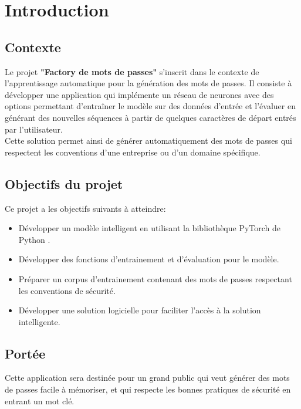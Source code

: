 \section{Introduction}

\subsection{Contexte}
Le projet \textbf{"Factory de mots de passes"} s'inscrit dans le contexte de l'apprentissage automatique pour la génération des mots de passes. Il consiste à développer une application qui implémente un réseau de neurones avec des options permettant d'entraîner le modèle sur des données d'entrée et l'évaluer en générant des nouvelles séquences à partir de quelques caractères de départ entrés par l'utilisateur.\\
Cette solution permet ainsi de générer automatiquement des mots de passes qui respectent les conventions d'une entreprise ou d'un domaine spécifique.
\subsection{Objectifs du projet}
Ce projet a les objectifs suivants à atteindre:
\begin{itemize}
    \item Développer un modèle intelligent en utilisant la bibliothèque PyTorch \cite{pytorch} de Python \cite{python}.
    \item Développer des fonctions d'entrainement et d'évaluation pour le modèle.
    \item Préparer un corpus d'entrainement contenant des mots de passes respectant les conventions de sécurité.
    \item Développer une solution logicielle pour faciliter l'accès à la solution intelligente.
\end{itemize}
\subsection{Portée}
Cette application sera destinée pour un grand public qui veut générer des mots de passes facile à mémoriser, et qui respecte les bonnes pratiques de sécurité en entrant un mot clé.
